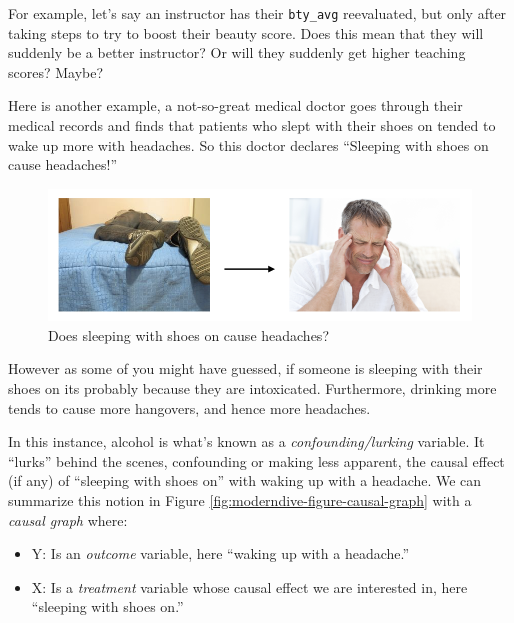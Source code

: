 \documentclass[12pt, krantz2,]{krantz}
\providecommand{\tightlist}{%
  \setlength{\itemsep}{0pt}\setlength{\parskip}{0pt}}
\begin{document}
For example, let's say an instructor has their \texttt{bty\_avg} reevaluated, but only after taking steps to try to boost their beauty score. Does this mean that they will suddenly be a better instructor? Or will they suddenly get higher teaching scores? Maybe?

Here is another example, a not-so-great medical doctor goes through their medical records and finds that patients who slept with their shoes on tended to wake up more with headaches. So this doctor declares ``Sleeping with shoes on cause headaches!''

\begin{figure}

{\centering \includegraphics[width=\textwidth]{images/flowcharts/flowchart.010-cropped} 

}

\caption{Does sleeping with shoes on cause headaches?}\label{fig:moderndive-figure-causal-graph-2}
\end{figure}

However as some of you might have guessed, if someone is sleeping with their shoes on its probably because they are intoxicated. Furthermore, drinking more tends to cause more hangovers, and hence more headaches.

In this instance, alcohol is what's known as a \emph{confounding/lurking} variable. It ``lurks'' behind the scenes, confounding or making less apparent, the causal effect (if any) of ``sleeping with shoes on'' with waking up with a headache. We can summarize this notion in Figure \ref{fig:moderndive-figure-causal-graph} with a \emph{causal graph} where:

\begin{itemize}
\tightlist
\item
  Y: Is an \emph{outcome} variable, here ``waking up with a headache.''
\item
  X: Is a \emph{treatment} variable whose causal effect we are interested in, here ``sleeping with shoes on.''
\end{itemize}
\end{document}
